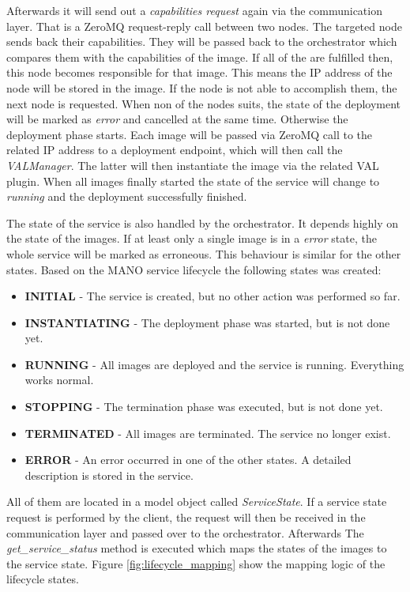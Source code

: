 Afterwards it will send out a \textit{capabilities request} again via the communication layer.
That is a ZeroMQ request-reply call between two nodes.
The targeted node sends back their capabilities.
They will be passed back to the orchestrator which compares them with the capabilities of the image.
If all of the are fulfilled then, this node becomes responsible for that image.
This means the \ac{IP} address of the node will be stored in the image.
If the node is not able to accomplish them, the next node is requested.
When non of the nodes suits, the state of the deployment will be marked as \textit{error} and cancelled at the same time.
Otherwise the deployment phase starts.
Each image will be passed via ZeroMQ call to the related \ac{IP} address to a deployment endpoint, which will then call the \textit{VALManager}.
The latter will then instantiate the image via the related \ac{VAL} plugin.
When all images finally started the state of the service will change to \textit{running} and the deployment successfully finished.\newline

The state of the service is also handled by the orchestrator.
It depends highly on the state of the images.
If at least only a single image is in a \textit{error} state, the whole service will be marked as erroneous.
This behaviour is similar for the other states.
Based on the \ac{MANO} service lifecycle the following states was created:\newline

\begin{itemize}
  \item \textbf{INITIAL} - The service is created, but no other action was performed so far.
  \item \textbf{INSTANTIATING} - The deployment phase was started, but is not done yet.
  \item \textbf{RUNNING} - All images are deployed and the service is running. Everything works normal.
  \item \textbf{STOPPING} - The termination phase was executed, but is not done yet.
  \item \textbf{TERMINATED} - All images are terminated. The service no longer exist.
  \item \textbf{ERROR} - An error occurred in one of the other states. A detailed description is stored in the service.
\end{itemize}
\bigskip

All of them are located in a model object called \textit{ServiceState}.
If a service state request is performed by the client, the request will then be received in the communication layer and passed over to the orchestrator.
Afterwards The \textit{get\_service\_status} method is executed which maps the states of the images to the service state.
Figure \ref{fig:lifecycle_mapping} show the mapping logic of the lifecycle states.\newline

